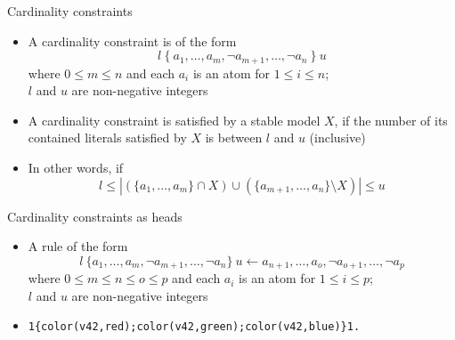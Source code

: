 \begin{frame}{Cardinality constraints}
  \begin{itemize}
  \item {} A \alert{cardinality constraint} is of the form
    \[
    l~\{\ a_1,\dots,a_m,\neg a_{m+1},\dots,\neg a_n\ \}~u
    \]
    where $0\leq m\leq n$ and each $a_i$ is an atom for $1\leq i\leq n$;\\
    $l$ and $u$ are non-negative integers
    \smallskip
  \item<2->  A cardinality constraint is satisfied by a stable model $X$,
    if the number of its contained literals satisfied by $X$ is between $l$ and $u$ (inclusive)
  \item<3->
    In other words, if
    \[
    l\leq|\left(\{a_1,\dots,a_m\}\cap X\right)\cup\left(\{a_{m+1},\dots,a_n\}\setminus X\right)|\leq u
    \]
  \end{itemize}
\end{frame}
\begin{frame}[fragile]{Cardinality constraints as heads}
  \begin{itemize}
  \item A rule of the form
    \[
    l~\{a_1,\dots,a_m,\neg a_{m+1},\dots,\neg a_n\}~u\leftarrow a_{n+1},\dots,a_o,\neg a_{o+1},\dots,\neg a_p
    \]
    where $0\leq m\leq n\leq o\leq p$ and each $a_i$ is an atom for $1\leq i\leq p$;\\
    $l$ and $u$ are non-negative integers
    \smallskip
  \item<3-> 
\begin{lstlisting}[basicstyle=\ttfamily\small]
1{color(v42,red);color(v42,green);color(v42,blue)}1.
\end{lstlisting}
  \end{itemize}
\end{frame}

